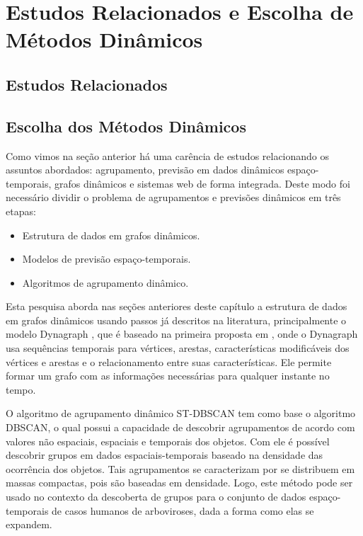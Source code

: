 \section{Estudos Relacionados e Escolha de Métodos Dinâmicos}
\label{sec:trabalhos-relacionados}


\subsection{Estudos Relacionados}
\label{subsec:estudos}

\subsection{Escolha dos Métodos Dinâmicos}
\label{subsec:metodos-escolhidos}

Como vimos na seção anterior há uma carência de estudos relacionando os assuntos abordados: agrupamento, previsão em dados dinâmicos espaço-temporais, grafos dinâmicos e sistemas web de forma integrada. Deste modo foi necessário dividir o problema de agrupamentos e previsões dinâmicos em três etapas:
\begin{itemize}
\item Estrutura de dados em grafos dinâmicos.
\item Modelos de previsão espaço-temporais.
\item Algoritmos de agrupamento dinâmico.
\end{itemize}

Esta pesquisa aborda nas seções anteriores deste capítulo a estrutura de dados em grafos dinâmicos usando passos já descritos na literatura, principalmente o modelo Dynagraph \cite{dynagraph}, que é baseado na primeira proposta em \cite{dynagraph2012}, onde o Dynagraph usa sequências temporais para vértices, arestas, características modificáveis dos vértices e arestas e o relacionamento entre suas características. Ele permite formar um grafo com as informações necessárias para qualquer instante no tempo. 

O algoritmo de agrupamento dinâmico \acrshort{ST-DBSCAN} tem como base o algoritmo \acrshort{DBSCAN}, o qual possui a capacidade de descobrir agrupamentos de acordo com valores não espaciais, espaciais e temporais dos objetos. Com ele é possível descobrir grupos em dados espaciais-temporais baseado na densidade das ocorrência dos objetos. Tais agrupamentos se caracterizam por se distribuem em massas compactas, pois são baseadas em densidade. Logo, este método pode ser usado no contexto da descoberta de grupos para o conjunto de dados espaço-temporais de casos humanos de arboviroses, dada a forma como elas se expandem. 

